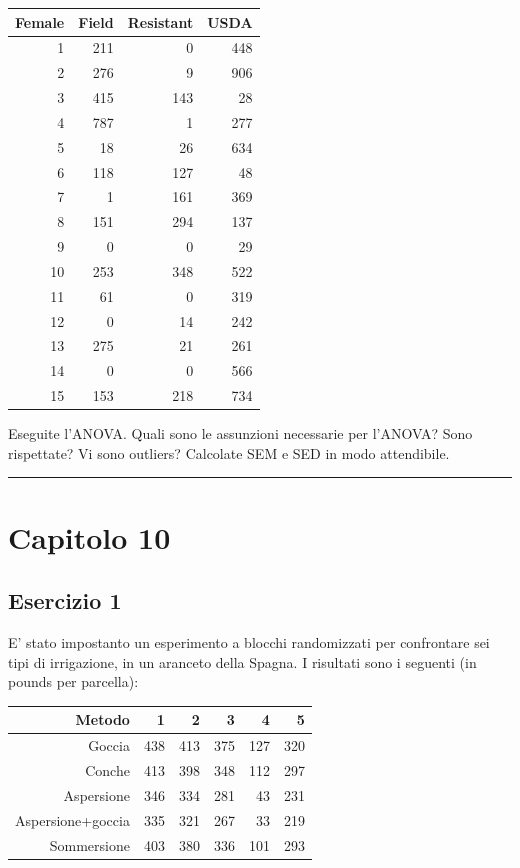 \documentclass[a4paper,12pt,oneside]{book}
\begin{document}
\begin{longtable}[]{@{}rrrr@{}}
\toprule
Female & Field & Resistant & USDA \\
\midrule
\endhead
1 & 211 & 0 & 448 \\
2 & 276 & 9 & 906 \\
3 & 415 & 143 & 28 \\
4 & 787 & 1 & 277 \\
5 & 18 & 26 & 634 \\
6 & 118 & 127 & 48 \\
7 & 1 & 161 & 369 \\
8 & 151 & 294 & 137 \\
9 & 0 & 0 & 29 \\
10 & 253 & 348 & 522 \\
11 & 61 & 0 & 319 \\
12 & 0 & 14 & 242 \\
13 & 275 & 21 & 261 \\
14 & 0 & 0 & 566 \\
15 & 153 & 218 & 734 \\
\bottomrule
\end{longtable}

Eseguite l'ANOVA. Quali sono le assunzioni necessarie per l'ANOVA? Sono rispettate? Vi sono outliers? Calcolate SEM e SED in modo attendibile.

\begin{center}\rule{0.5\linewidth}{0.5pt}\end{center}

\hypertarget{capitolo-10}{%
\section{Capitolo 10}\label{capitolo-10}}

\hypertarget{esercizio-1-6}{%
\subsection{Esercizio 1}\label{esercizio-1-6}}

E' stato impostanto un esperimento a blocchi randomizzati per confrontare sei tipi di irrigazione, in un aranceto della Spagna. I risultati sono i seguenti (in pounds per parcella):

\begin{longtable}[]{@{}rrrrrr@{}}
\toprule
Metodo & 1 & 2 & 3 & 4 & 5 \\
\midrule
\endhead
Goccia & 438 & 413 & 375 & 127 & 320 \\
Conche & 413 & 398 & 348 & 112 & 297 \\
Aspersione & 346 & 334 & 281 & 43 & 231 \\
Aspersione+goccia & 335 & 321 & 267 & 33 & 219 \\
Sommersione & 403 & 380 & 336 & 101 & 293 \\
\bottomrule
\end{longtable}
\end{document}
